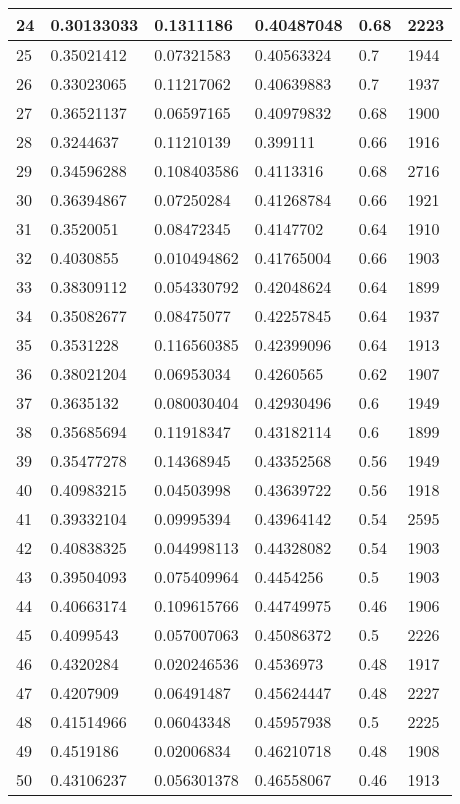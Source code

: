 \begin{longtable}{|l|l|l|l|l|l|}
24 & 0.30133033 & 0.1311186 & 0.40487048 & 0.68 & 2223 \\ \hline 
25 & 0.35021412 & 0.07321583 & 0.40563324 & 0.7 & 1944 \\ \hline 
26 & 0.33023065 & 0.11217062 & 0.40639883 & 0.7 & 1937 \\ \hline 
27 & 0.36521137 & 0.06597165 & 0.40979832 & 0.68 & 1900 \\ \hline 
28 & 0.3244637 & 0.11210139 & 0.399111 & 0.66 & 1916 \\ \hline 
29 & 0.34596288 & 0.108403586 & 0.4113316 & 0.68 & 2716 \\ \hline 
30 & 0.36394867 & 0.07250284 & 0.41268784 & 0.66 & 1921 \\ \hline 
31 & 0.3520051 & 0.08472345 & 0.4147702 & 0.64 & 1910 \\ \hline 
32 & 0.4030855 & 0.010494862 & 0.41765004 & 0.66 & 1903 \\ \hline 
33 & 0.38309112 & 0.054330792 & 0.42048624 & 0.64 & 1899 \\ \hline 
34 & 0.35082677 & 0.08475077 & 0.42257845 & 0.64 & 1937 \\ \hline 
35 & 0.3531228 & 0.116560385 & 0.42399096 & 0.64 & 1913 \\ \hline 
36 & 0.38021204 & 0.06953034 & 0.4260565 & 0.62 & 1907 \\ \hline 
37 & 0.3635132 & 0.080030404 & 0.42930496 & 0.6 & 1949 \\ \hline 
38 & 0.35685694 & 0.11918347 & 0.43182114 & 0.6 & 1899 \\ \hline 
39 & 0.35477278 & 0.14368945 & 0.43352568 & 0.56 & 1949 \\ \hline 
40 & 0.40983215 & 0.04503998 & 0.43639722 & 0.56 & 1918 \\ \hline 
41 & 0.39332104 & 0.09995394 & 0.43964142 & 0.54 & 2595 \\ \hline 
42 & 0.40838325 & 0.044998113 & 0.44328082 & 0.54 & 1903 \\ \hline 
43 & 0.39504093 & 0.075409964 & 0.4454256 & 0.5 & 1903 \\ \hline 
44 & 0.40663174 & 0.109615766 & 0.44749975 & 0.46 & 1906 \\ \hline 
45 & 0.4099543 & 0.057007063 & 0.45086372 & 0.5 & 2226 \\ \hline 
46 & 0.4320284 & 0.020246536 & 0.4536973 & 0.48 & 1917 \\ \hline 
47 & 0.4207909 & 0.06491487 & 0.45624447 & 0.48 & 2227 \\ \hline 
48 & 0.41514966 & 0.06043348 & 0.45957938 & 0.5 & 2225 \\ \hline 
49 & 0.4519186 & 0.02006834 & 0.46210718 & 0.48 & 1908 \\ \hline 
50 & 0.43106237 & 0.056301378 & 0.46558067 & 0.46 & 1913 \\ \hline 
\end{longtable}
